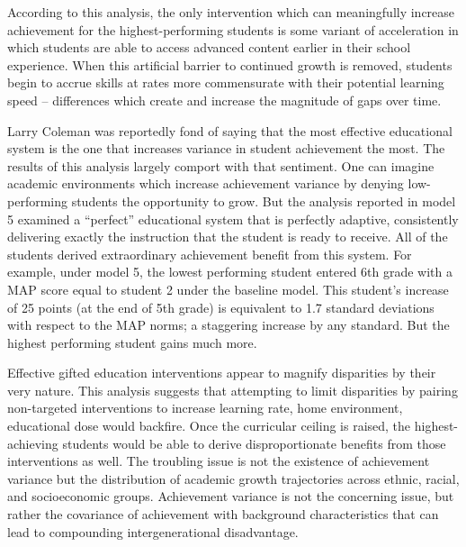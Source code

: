 \documentclass[english,floatsintext,jou]{apa6}
\theoremstyle{definition}
\theoremstyle{definition}
\theoremstyle{definition}
\theoremstyle{remark}
\begin{document}
According to this analysis, the only intervention which can meaningfully
increase achievement for the highest-performing students is some variant
of acceleration in which students are able to access advanced content
earlier in their school experience. When this artificial barrier to
continued growth is removed, students begin to accrue skills at rates
more commensurate with their potential learning speed -- differences
which create and increase the magnitude of gaps over time.

Larry Coleman was reportedly fond of saying that the most effective
educational system is the one that increases variance in student
achievement the most. The results of this analysis largely comport with
that sentiment. One can imagine academic environments which increase
achievement variance by denying low-performing students the opportunity
to grow. But the analysis reported in model 5 examined a
\enquote{perfect} educational system that is perfectly adaptive,
consistently delivering exactly the instruction that the student is
ready to receive. All of the students derived extraordinary achievement
benefit from this system. For example, under model 5, the lowest
performing student entered 6th grade with a MAP score equal to student 2
under the baseline model. This student's increase of 25 points (at the
end of 5th grade) is equivalent to 1.7 standard deviations with respect
to the MAP norms; a staggering increase by any standard. But the highest
performing student gains much more.

Effective gifted education interventions appear to magnify disparities
by their very nature. This analysis suggests that attempting to limit
disparities by pairing non-targeted interventions to increase learning
rate, home environment, educational dose would backfire. Once the
curricular ceiling is raised, the highest-achieving students would be
able to derive disproportionate benefits from those interventions as
well. The troubling issue is not the existence of achievement variance
but the distribution of academic growth trajectories across ethnic,
racial, and socioeconomic groups. Achievement variance is not the
concerning issue, but rather the covariance of achievement with
background characteristics that can lead to compounding
intergenerational disadvantage.
\end{document}
